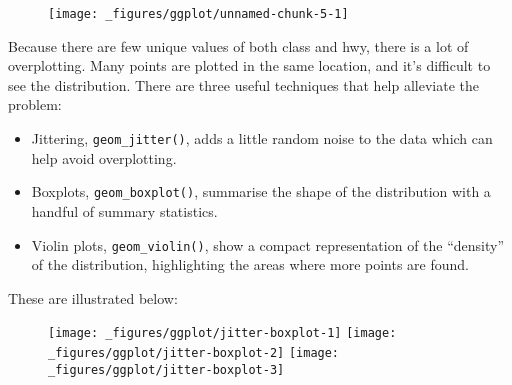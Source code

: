 \begin{Shaded}
\begin{Highlighting}[]
\StringTok{ }
\StringTok{  }\NormalTok{()}
\end{Highlighting}
\end{Shaded}

\begin{figure}[H]
  \centering
  \texttt{[image: \_figures/ggplot/unnamed-chunk-5-1]}
\end{figure}

Because there are few unique values of both class and hwy, there is a
lot of overplotting. Many points are plotted in the same location, and
it's difficult to see the distribution. There are three useful
techniques that help alleviate the problem:

\begin{itemize}
\item
  Jittering, \texttt{geom\_jitter()}, adds a little random noise to the
  data which can help avoid overplotting. 
\item
  Boxplots, \texttt{geom\_boxplot()}, summarise the shape of the
  distribution with a handful of summary statistics. 
\item
  Violin plots, \texttt{geom\_violin()}, show a compact representation
  of the ``density'' of the distribution, highlighting the areas where
  more points are found.  
\end{itemize}

These are illustrated below:

\begin{Shaded}
\begin{Highlighting}[]
\StringTok{ }\NormalTok{()}
\StringTok{ }\NormalTok{()}
\StringTok{ }\NormalTok{()}
\end{Highlighting}
\end{Shaded}

\begin{figure}[H]
  \texttt{[image: \_figures/ggplot/jitter-boxplot-1]}%
  \texttt{[image: \_figures/ggplot/jitter-boxplot-2]}%
  \texttt{[image: \_figures/ggplot/jitter-boxplot-3]}
\end{figure}


